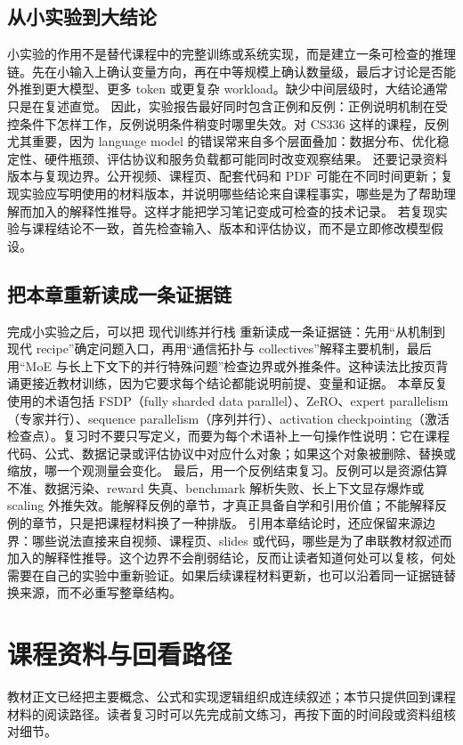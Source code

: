 \documentclass[a4paper]{article}
\begin{document}
\subsection{从小实验到大结论}
小实验的作用不是替代课程中的完整训练或系统实现，而是建立一条可检查的推理链。先在小输入上确认变量方向，再在中等规模上确认数量级，最后才讨论是否能外推到更大模型、更多 token 或更复杂 workload。缺少中间层级时，大结论通常只是在复述直觉。
因此，实验报告最好同时包含正例和反例：正例说明机制在受控条件下怎样工作，反例说明条件稍变时哪里失效。对 CS336 这样的课程，反例尤其重要，因为 language model 的错误常来自多个层面叠加：数据分布、优化稳定性、硬件瓶颈、评估协议和服务负载都可能同时改变观察结果。
还要记录资料版本与复现边界。公开视频、课程页、配套代码和 PDF 可能在不同时间更新；复现实验应写明使用的材料版本，并说明哪些结论来自课程事实，哪些是为了帮助理解而加入的解释性推导。这样才能把学习笔记变成可检查的技术记录。
若复现实验与课程结论不一致，首先检查输入、版本和评估协议，而不是立即修改模型假设。
\subsection{把本章重新读成一条证据链}
完成小实验之后，可以把 现代训练并行栈 重新读成一条证据链：先用“从机制到现代 recipe”确定问题入口，再用“通信拓扑与 collectives”解释主要机制，最后用“MoE 与长上下文下的并行特殊问题”检查边界或外推条件。这种读法比按页背诵更接近教材训练，因为它要求每个结论都能说明前提、变量和证据。
本章反复使用的术语包括 FSDP（fully sharded data parallel）、ZeRO、expert parallelism（专家并行）、sequence parallelism（序列并行）、activation checkpointing（激活检查点）。复习时不要只写定义，而要为每个术语补上一句操作性说明：它在课程代码、公式、数据记录或评估协议中对应什么对象；如果这个对象被删除、替换或缩放，哪一个观测量会变化。
最后，用一个反例结束复习。反例可以是资源估算不准、数据污染、reward 失真、benchmark 解析失败、长上下文显存爆炸或 scaling 外推失效。能解释反例的章节，才真正具备自学和引用价值；不能解释反例的章节，只是把课程材料换了一种排版。
引用本章结论时，还应保留来源边界：哪些说法直接来自视频、课程页、slides 或代码，哪些是为了串联教材叙述而加入的解释性推导。这个边界不会削弱结论，反而让读者知道何处可以复核，何处需要在自己的实验中重新验证。如果后续课程材料更新，也可以沿着同一证据链替换来源，而不必重写整章结构。
\section{课程资料与回看路径}
教材正文已经把主要概念、公式和实现逻辑组织成连续叙述；本节只提供回到课程材料的阅读路径。读者复习时可以先完成前文练习，再按下面的时间段或资料组核对细节。
\end{document}
